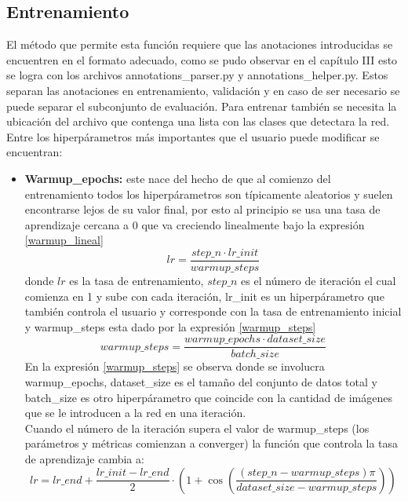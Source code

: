 \subsection{Entrenamiento} 
El método que permite esta función requiere que las anotaciones introducidas se encuentren en el formato adecuado, como se pudo observar en el capítulo III esto se logra con los archivos annotations\_parser.py y annotations\_helper.py. Estos separan las anotaciones en entrenamiento, validación y en caso de ser necesario se puede separar el subconjunto de evaluación. Para entrenar también se necesita la ubicación del archivo que contenga una lista con las clases que detectara la red. Entre los hiperpárametros más importantes que el usuario puede modificar se encuentran:
\begin{itemize}
    \item \textbf{Warmup\_epochs:} este nace del hecho de que al comienzo del entrenamiento todos los hiperpárametros son típicamente aleatorios y suelen encontrarse lejos de su valor final, por esto al principio se usa una tasa de aprendizaje cercana a 0 que va creciendo linealmente bajo la expresión \eqref{warmup_lineal}
    \begin{equation}
        lr = \frac{step\_n \cdot lr\_init}{warmup\_steps}\label{warmup_lineal}
    \end{equation}
    donde $lr$ es la tasa de entrenamiento, $step\_n$ es el número de iteración el cual comienza en 1 y sube con cada iteración, lr\_init es un hiperpárametro que también controla el usuario y corresponde con la tasa de entrenamiento inicial y warmup\_steps esta dado por la expresión \eqref{warmup_steps}
    \begin{equation}
        warmup\_steps = \frac{warmup\_epochs \cdot dataset\_size}{batch\_size} \label{warmup_steps}
    \end{equation}
    En la expresión \eqref{warmup_steps} se observa donde se involucra warmup\_epochs, dataset\_size es el tamaño del conjunto de datos total y batch\_size es otro hiperpárametro que coincide con la cantidad de imágenes que se le introducen a la red en una iteración. 
    \\
    Cuando el número de la iteración supera el valor de warmup\_steps (los parámetros y métricas comienzan a converger) la función que controla la tasa de aprendizaje cambia a:
    \begin{equation}
        lr = lr\_end + \frac{lr\_init - lr\_end}{2}\cdot \left(1 + \cos\left(\frac{(step\_n - warmup\_steps)\pi}{dataset\_size - warmup\_steps}\right) \right) \label{lr_cos}

\end{equation}
\end{itemize}
